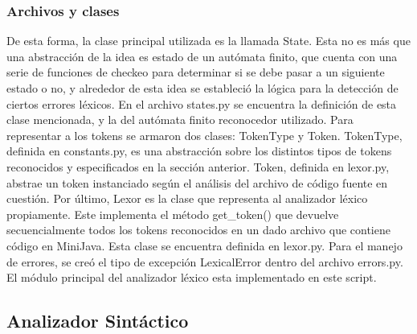 \documentclass [a4paper,abstracton,titlepage]{scrartcl}
\begin{document}
\subsubsection{Archivos y clases}
\label{_archivos_y_clases}
\hypertarget{_clase_texttt_state}{}
\label{_clase_texttt_state}
De esta forma, la clase principal utilizada es la llamada State. Esta
no es más que una abstracción de la idea es estado de un autómata
finito, que cuenta con una serie de funciones de checkeo para
determinar si se debe pasar a un siguiente estado o no, y alrededor de
esta idea se estableció la lógica para la detección de ciertos errores
léxicos.
En el archivo states.py se encuentra la definición de esta clase
mencionada, y la del autómata finito reconocedor utilizado.
\hypertarget{_clases_texttt_token_y_texttt_tokentype}{}
\label{_clases_texttt_token_y_texttt_tokentype}
Para representar a los tokens se armaron dos clases: TokenType y
Token.  TokenType, definida en constants.py, es una abstracción sobre
los distintos tipos de tokens reconocidos y especificados en la
sección anterior.  Token, definida en lexor.py, abstrae un token
instanciado según el análisis del archivo de código fuente en
cuestión.
\hypertarget{_clase_texttt_lexor}{}
\label{_clase_texttt_lexor}
Por último, Lexor es la clase que representa al analizador léxico
propiamente.  Este implementa el método get\_{}token() que devuelve
secuencialmente todos los tokens reconocidos en un dado archivo que
contiene código en MiniJava. Esta clase se encuentra definida en
lexor.py.
\hypertarget{_clase_texttt_lexicalerror}{}
\label{_clase_texttt_lexicalerror}
Para el manejo de errores, se creó el tipo de excepción LexicalError
dentro del archivo errors.py.
\hypertarget{_archivo_texttt_lexor___main_py}{}
\label{_archivo_texttt_lexor___main_py}
El módulo principal del analizador léxico esta implementado en este script.

\subsection{Analizador Sintáctico}
\hypertarget{_archivos_y_clases}{}
\end{document}
